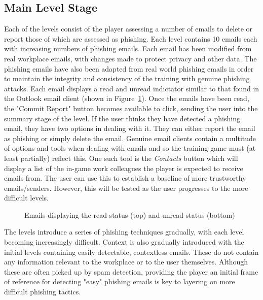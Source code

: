 \documentclass{l4proj}
\begin{document}
\subsection{Main Level Stage}
Each of the levels consist of the player assessing a number of emails to delete or report those of which are assessed as phishing. Each level contains 10 emails each with increasing numbers of phishing emails. Each email has been modified from real workplace emails, with changes made to protect privacy and other data. The phishing emails have also been adapted from real world phishing emails in order to maintain the integrity and consistency of the training with genuine phishing attacks. Each email displays a read and unread indictator similar to that found in the Outlook email client (shown in Figure~\ref{fig:read_unread}). Once the emails have been read, the "Commit Report" button becomes available to click, sending the user into the summary stage of the level. If the user thinks they have detected a phishing email, they have two options in dealing with it. They can either report the email as phishing or simply delete the email. Genuine email clients contain a multitude of options and tools when dealing with emails and so the training game must (at least partially) reflect this. One such tool is the \textit{Contacts} button which will display a list of the in-game work colleagues the player is expected to receive emails from. The user can use this to establish a baseline of more trustworthy emails/senders. However, this will be tested as the user progresses to the more difficult levels.

\begin{figure}[H]
    \centering
    \caption{Emails displaying the read status (top) and unread status (bottom)}
    \label{fig:read_unread}
\end{figure}

The levels introduce a series of phishing techniques gradually, with each level becoming increasingly difficult. Context is also gradually introduced with the initial levels containing easily detectable, contextless emails. These do not contain any information relevant to the workplace or to the user themselves. Although these are often picked up by spam detection, providing the player an initial frame of reference for detecting "easy" phishing emails is key to layering on more difficult phishing tactics. 
\end{document}
